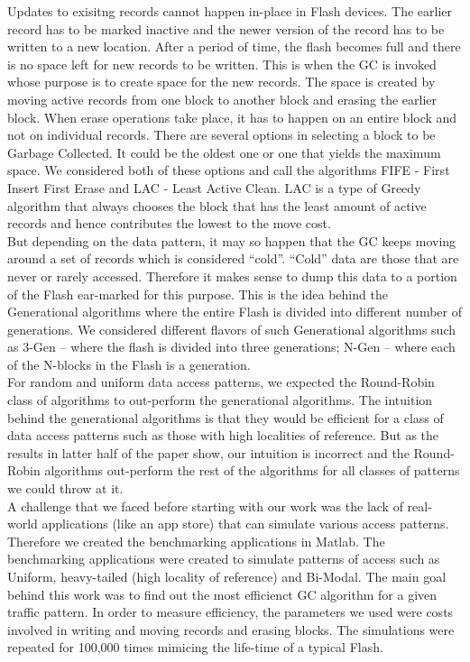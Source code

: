 	Updates to exisitng records cannot happen in-place in Flash devices. The earlier record has to be marked inactive and the newer version of the record has to be written to a new location. After a period of time, the flash becomes full and there is no space left for new records to be written. This is when the GC is invoked whose purpose is to create space for the new records. The space is created by moving active records from one block to another block and erasing the earlier block. When erase operations take place, it has to happen on an entire block and not on individual records. There are several options in selecting a block to be Garbage Collected. It could be the oldest one or one that yields the maximum space. We considered both of these options and call the algorithms FIFE - First Insert First Erase and LAC - Least Active Clean. LAC is a type of Greedy algorithm that always chooses the block that has the least amount of active records and hence contributes the lowest to the move cost. \\

	But depending on the data pattern, it may so happen that the GC keeps moving around a set of records which is considered ``cold''. ``Cold'' data are those that are never or rarely accessed. Therefore it makes sense to dump this data to a portion of the Flash ear-marked for this purpose. This is the idea behind the Generational algorithms where the entire Flash is divided into different number of generations. We considered different flavors of such Generational algorithms such as 3-Gen -- where the flash is divided into three generations; N-Gen -- where each of the N-blocks in the Flash is a generation.\\

	For random and uniform data access patterns, we expected the Round-Robin class of algorithms to out-perform the generational algorithms. The intuition behind the generational algorithms is that they would be efficient for a class of data access patterns such as those with high localities of reference. But as the results in latter half of the paper show, our intuition is incorrect and the Round-Robin algorithms out-perform the rest of the algorithms for all classes of patterns we could throw at it. \\

	A challenge that we faced before starting with our work was the lack of real-world applications (like an app store) that can simulate various access patterns. Therefore we created the benchmarking applications in Matlab. The benchmarking applications were created to simulate patterns of access such as Uniform, heavy-tailed (high locality of reference) and Bi-Modal. The main goal behind this work was to find out the most efficienct GC algorithm for a given traffic pattern. In order to measure efficiency, the parameters we used were costs involved in writing and moving records and erasing blocks. The simulations were repeated for 100,000 times mimicing the life-time of a typical Flash. \\


